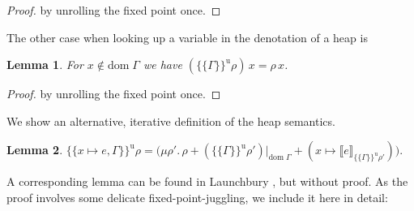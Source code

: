 \documentclass[twopage]{scrartcl}
\newtheorem{lemma}{Lemma}
\theoremstyle{nonumberbreak}
\newtheorem{proof}{Proof}
\newcommand{\dom}[1]{\text{dom}\;#1}
\newcommand{\dsem}[2]{\llbracket #1 \rrbracket_{#2}}
\newcommand{\esemu}[1]{\{\!\!\!\{#1\}\!\!\!\}^{\text{u}}}
\newcommand{\shortcite}{\cite}
\begin{document}
\begin{proof}
by unrolling the fixed point once.
\end{proof}

The other case when looking up a variable in the denotation of a heap is

\begin{lemma}
\label{lem:esemu_other}
For $x \notin \dom\Gamma$ we have $(\esemu{\Gamma}\rho)\,x = \rho\, x$.
\end{lemma}

\begin{proof}
by unrolling the fixed point once.
\end{proof}

We show an alternative, iterative definition of the heap semantics.

\begin{lemma}
$
\esemu{x \mapsto e, \Gamma}\rho = \big(\mu \rho'.\,  \rho + (\esemu{\Gamma}{\rho'})|_{\dom\Gamma} + (x \mapsto \dsem{e}{\esemu{\Gamma}\rho'})\big).
$
\label{lem:iter}
\end{lemma}

A corresponding lemma can be found in Launchbury \shortcite{launchbury}, but without proof. As the proof involves some delicate fixed-point-juggling, we include it here in detail:
\end{document}
